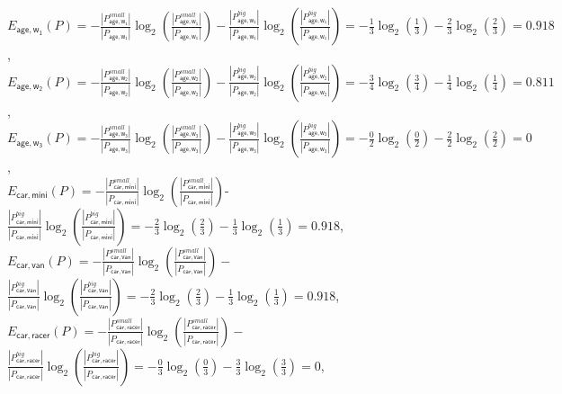 \documentclass[10pt,a4paper]{article}
\begin{document}
\begin{enumerate}
$\displaystyle E_{\mathsf{age,w_1}}(P)=-\frac{|P_{\mathsf{age,w_1}}^{small}|}{|P_{\mathsf{age,w_1}}|}\log_2(\frac{|P^{small}_{\mathsf{age,w_1}}|}{|P_{\mathsf{age,w_1}}|})-\frac{|P^{big}_{\mathsf{age,w_1}}|}{|P_{\mathsf{age,w_1}}|}\log_2(\frac{|P^{big}_{\mathsf{age,w_1}}|}{|P_{\mathsf{age,w_1}}|})=-\frac{1}{3}\log_2(\frac{1}{3})-\frac{2}{3}\log_2(\frac{2}{3})=0.918$,\\
$\displaystyle E_{\mathsf{age,w_2}}(P)=-\frac{|P_{\mathsf{age,w_2}}^{small}|}{|P_{\mathsf{age,w_2}}|}\log_2(\frac{|P^{small}_{\mathsf{age,w_2}}|}{|P_{\mathsf{age,w_2}}|})-\frac{|P^{big}_{\mathsf{age,w_2}}|}{|P_{\mathsf{age,w_2}}|}\log_2(\frac{|P^{big}_{\mathsf{age,w_2}}|}{|P_{\mathsf{age,w_2}}|})=-\frac{3}{4}\log_2(\frac{3}{4})-\frac{1}{4}\log_2(\frac{1}{4})=0.811$,\\
$\displaystyle E_{\mathsf{age,w_3}}(P)=-\frac{|P_{\mathsf{age,w_3}}^{small}|}{|P_{\mathsf{age,w_3}}|}\log_2(\frac{|P^{small}_{\mathsf{age,w_3}}|}{|P_{\mathsf{age,w_3}}|})-\frac{|P^{big}_{\mathsf{age,w_3}}|}{|P_{\mathsf{age,w_3}}|}\log_2(\frac{|P^{big}_{\mathsf{age,w_3}}|}{|P_{\mathsf{age,w_3}}|})=-\frac{0}{2}\log_2(\frac{0}{2})-\frac{2}{2}\log_2(\frac{2}{2})=0$,\\
$\displaystyle E_{\mathsf{car,mini}}(P)=-\frac{|P_{\mathsf{car,mini}}^{small}|}{|P_{\mathsf{car,mini}}|}\log_2(\frac{|P^{small}_{\mathsf{car,mini}}|}{|P_{\mathsf{car,mini}}|})$-\\
$\displaystyle \frac{|P^{big}_{\mathsf{car,mini}}|}{|P_{\mathsf{car,mini}}|}\log_2(\frac{|P^{big}_{\mathsf{car,mini}}|}{|P_{\mathsf{car,mini}}|})=-\frac{2}{3}\log_2(\frac{2}{3})-\frac{1}{3}\log_2(\frac{1}{3})=0.918$,\\
$\displaystyle E_{\mathsf{car,van}}(P)=-\frac{|P_{\mathsf{car,van}}^{small}|}{|P_{\mathsf{car,van}}|}\log_2(\frac{|P^{small}_{\mathsf{car,van}}|}{|P_{\mathsf{car,van}}|})-$\\
$\displaystyle \frac{|P^{big}_{\mathsf{car,van}}|}{|P_{\mathsf{car,van}}|}\log_2(\frac{|P^{big}_{\mathsf{car,van}}|}{|P_{\mathsf{car,van}}|})=-\frac{2}{3}\log_2(\frac{2}{3})-\frac{1}{3}\log_2(\frac{1}{3})=0.918$,\\
$\displaystyle E_{\mathsf{car,racer}}(P)=-\frac{|P_{\mathsf{car,racer}}^{small}|}{|P_{\mathsf{car,racer}}|}\log_2(\frac{|P^{small}_{\mathsf{car,racer}}|}{|P_{\mathsf{car,racer}}|})-$\\
$\displaystyle \frac{|P^{big}_{\mathsf{car,racer}}|}{|P_{\mathsf{car,racer}}|}\log_2(\frac{|P^{big}_{\mathsf{car,racer}}|}{|P_{\mathsf{car,racer}}|})=-\frac{0}{3}\log_2(\frac{0}{3})-\frac{3}{3}\log_2(\frac{3}{3})=0$,\\

\end{enumerate}
\end{document}
